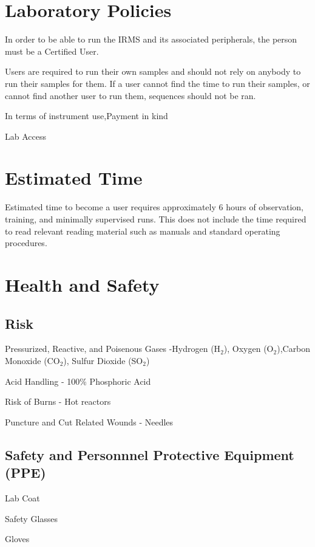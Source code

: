 \documentclass[12pt]{../SOP3_beta}\usepackage[]{graphicx}\usepackage[]{color}
\begin{document}
\section{Laboratory Policies}

\NP In order to be able to run the IRMS and its associated peripherals, the person must be a Certified User.

\NP Users are required to run their own samples and should not rely on anybody to run their samples for them. If a user cannot find the time to run their samples, or cannot find another user to run them, sequences should not be ran.

\NP In terms of instrument use,Payment in kind

\NP Lab Access

\section{Estimated Time}

\NP Estimated time to become a user requires approximately 6 hours of observation, training, and minimally supervised runs. This does not include the time required to read relevant reading material such as manuals and standard operating procedures.

\section{Health and Safety}

\subsection{Risk}

\NP Pressurized, Reactive, and Poisenous Gases -Hydrogen (H$_2$), Oxygen (O$_2$),Carbon Monoxide (CO$_2$), Sulfur Dioxide (SO$_2$)

\NP Acid Handling - 100\% Phosphoric Acid

\NP Risk of Burns - Hot reactors

\NP Puncture and Cut Related Wounds - Needles

\subsection{Safety and Personnnel Protective Equipment (PPE)}

\NP Lab Coat

\NP Safety Glasses

\NP Gloves
\end{document}
